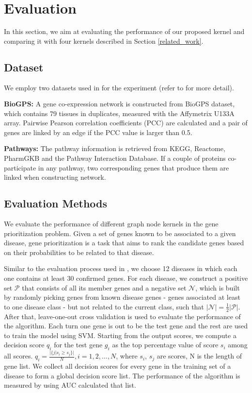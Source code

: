\documentclass{esannV2}
\begin{document}
\section{Evaluation}
\label{evaluation}
In this section, we aim at evaluating the performance of our proposed kernel and comparing it with four kernels described in Section \ref{related_work}.
\subsection{Dataset}
We employ two datasets used in \cite{medk} for the experiment (refer to \cite{medk} for more detail).

\textbf{BioGPS:} A gene co-expression network is constructed from BioGPS dataset, which contains 79 tissues in duplicates, measured with the Affymetrix U133A array. Pairwise Pearson correlation coefficients (PCC) are calculated and a pair of genes are linked by an edge if the PCC value is larger than 0.5.

\textbf{Pathways:} The pathway information is retrieved from KEGG, Reactome, PharmGKB and the Pathway Interaction Database. If a couple of proteins co-participate in any pathway, two corresponding genes that produce them are linked when constructing network.  
\subsection{Evaluation Methods}
We evaluate the performance of different graph node kernels in the gene prioritization problem. Given a set of genes known to be associated to a given disease, gene prioritization is a task that aims to rank the candidate genes based on their probabilities to be related to that disease.

Similar to the evaluation process used in \cite{medk}, we choose 12 diseases in which each one contains at least 30 confirmed genes. For each disease, we construct a positive set $\mathcal{P}$ that consists of all its member genes and a negative set $\mathcal{N}$, which is built by randomly picking genes from known disease genes - genes associated at least to one disease class - but not related to the current class, such that $\vert \mathcal{N} \vert = \frac{1}{2} \vert \mathcal{P} \vert$. After that, leave-one-out cross validation is used to evaluate the performance of the algorithm. Each turn one gene is out to be the test gene and the rest are used to train the model using SVM. Starting from the output scores, we compute a decision score $q_i$ for the test gene $g_i$ as the top percentage value of score $s_i$ among all scores. $q_{i} = \frac{\vert \{j\vert s_{i} \geq s_{j}  \rbrace \vert}{N}, i = 1,2,\ldots,N$, where $s_i$, $s_j$ are scores, N is the length of gene list. We collect all decision scores for every gene in the training set of a disease to form a global decision score list. The performance of the algorithm is measured by using AUC calculated that list. 
\end{document}

